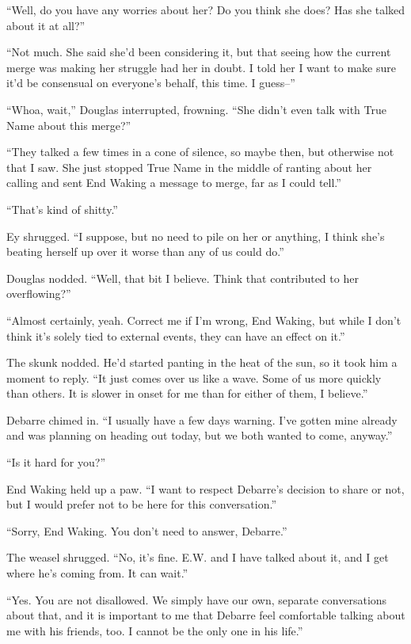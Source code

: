 ``Well, do you have any worries about her? Do you think she does? Has she talked about it at all?''

``Not much. She said she'd been considering it, but that seeing how the current merge was making her struggle had her in doubt. I told her I want to make sure it'd be consensual on everyone's behalf, this time. I guess--''

``Whoa, wait,'' Douglas interrupted, frowning. ``She didn't even talk with True Name about this merge?''

``They talked a few times in a cone of silence, so maybe then, but otherwise not that I saw. She just stopped True Name in the middle of ranting about her calling and sent End Waking a message to merge, far as I could tell.''

``That's kind of shitty.''

Ey shrugged. ``I suppose, but no need to pile on her or anything, I think she's beating herself up over it worse than any of us could do.''

Douglas nodded. ``Well, that bit I believe. Think that contributed to her overflowing?''

``Almost certainly, yeah. Correct me if I'm wrong, End Waking, but while I don't think it's solely tied to external events, they can have an effect on it.''

The skunk nodded. He'd started panting in the heat of the sun, so it took him a moment to reply. ``It just comes over us like a wave. Some of us more quickly than others. It is slower in onset for me than for either of them, I believe.''

Debarre chimed in. ``I usually have a few days warning. I've gotten mine already and was planning on heading out today, but we both wanted to come, anyway.''

``Is it hard for you?''

End Waking held up a paw. ``I want to respect Debarre's decision to share or not, but I would prefer not to be here for this conversation.''

``Sorry, End Waking. You don't need to answer, Debarre.''

The weasel shrugged. ``No, it's fine. E.W. and I have talked about it, and I get where he's coming from. It can wait.''

``Yes. You are not disallowed. We simply have our own, separate conversations about that, and it is important to me that Debarre feel comfortable talking about me with his friends, too. I cannot be the only one in his life.''


